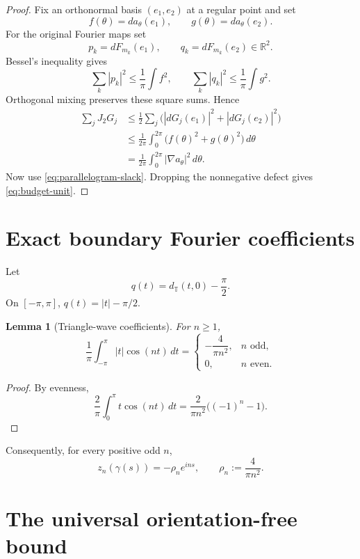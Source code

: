 \documentclass[11pt]{article}
\newtheorem{lemma}[theorem]{Lemma}
\newcommand{\T}{\mathbb T}
\newcommand{\R}{\mathbb R}
\begin{document}
\begin{proof}
Fix an orthonormal basis $(e_1,e_2)$ at a regular point and set
\[
        f(\theta)=da_\theta(e_1),\qquad
        g(\theta)=da_\theta(e_2).
\]
For the original Fourier maps set
\[
        p_k=dF_{m_k}(e_1),\qquad
        q_k=dF_{m_k}(e_2)\in\R^2.
\]
Bessel's inequality gives
\[
 \sum_k|p_k|^2\le\frac1\pi\int f^2,\qquad
 \sum_k|q_k|^2\le\frac1\pi\int g^2.
\]
Orthogonal mixing preserves these square sums.  Hence
\[
\begin{aligned}
 \sum_jJ_2G_j
 &\le\frac12\sum_j
     \bigl(|dG_j(e_1)|^2+|dG_j(e_2)|^2\bigr)\\
 &\le\frac1{2\pi}\int_0^{2\pi}
       \bigl(f(\theta)^2+g(\theta)^2\bigr)\,d\theta\\
 &=\frac1{2\pi}\int_0^{2\pi}|\nabla a_\theta|^2\,d\theta.
\end{aligned}
\]
Now use \eqref{eq:parallelogram-slack}.  Dropping the nonnegative defect
gives \eqref{eq:budget-unit}.
\end{proof}

\section{Exact boundary Fourier coefficients}

Let
\[
        q(t)=d_{\T}(t,0)-\frac{\pi}{2}.
\]
On $[-\pi,\pi]$, $q(t)=|t|-\pi/2$.

\begin{lemma}[Triangle-wave coefficients]\label{lem:triangle}
For $n\ge1$,
\[
 \frac1\pi\int_{-\pi}^{\pi}|t|\cos(nt)\,dt
 =
 \begin{cases}
 -\dfrac4{\pi n^2},&n\text{ odd},\\[1.5mm]
 0,&n\text{ even}.
 \end{cases}
\]
\end{lemma}

\begin{proof}
By evenness,
\[
 \frac2\pi\int_0^\pi t\cos(nt)\,dt
 =
 \frac{2}{\pi n^2}\bigl((-1)^n-1\bigr).
\]
\end{proof}

Consequently, for every positive odd $n$,
\begin{equation}\label{eq:boundary-zn}
        \boxed{
        z_n(\gamma(s))
        =-\rho_n e^{ins},
        \qquad
        \rho_n:=\frac4{\pi n^2}.}
\end{equation}

\section{The universal orientation-free bound}
\end{document}
